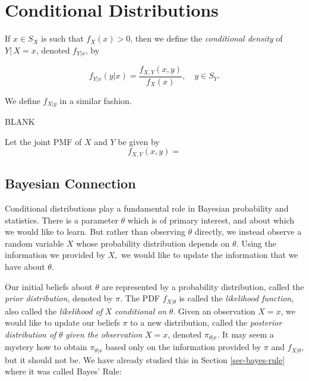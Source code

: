 \documentclass[]{book}
\numberwithin{equation}{chapter}
\numberwithin{figure}{chapter}
\theoremstyle{plain}
\theoremstyle{definition}
\theoremstyle{remark}
\theoremstyle{definition}
\theoremstyle{definition}
\theoremstyle{remark}
\let\BeginKnitrBlock\begin \let\EndKnitrBlock\end
\begin{document}
\section{Conditional Distributions}\label{sec-conditional-distributions}

If \(x\in S_{X}\) is such that \(f_{X}(x)>0\), then we define the
\emph{conditional density} of \(Y|\, X=x\), denoted \(f_{Y|x}\), by

\begin{equation}
f_{Y|x}(y|x)=\frac{f_{X,Y}(x,y)}{f_{X}(x)},\quad y\in S_{Y}.
\end{equation}

We define \(f_{X|y}\) in a similar fashion.

BLANK

\bigskip

\BeginKnitrBlock{example}
\protect\hypertarget{ex:unnamed-chunk-305}{}{\label{ex:unnamed-chunk-305}}Let
the joint PMF of \(X\) and \(Y\) be given by \[
f_{X,Y}(x,y) =
\]
\EndKnitrBlock{example}

\subsection{Bayesian Connection}\label{bayesian-connection}

Conditional distributions play a fundamental role in Bayesian
probability and statistics. There is a parameter \(\theta\) which is of
primary interest, and about which we would like to learn. But rather
than observing \(\theta\) directly, we instead observe a random variable
\(X\) whose probability distribution depends on \(\theta\). Using the
information we provided by \(X,\) we would like to update the
information that we have about \(\theta\).

Our initial beliefs about \(\theta\) are represented by a probability
distribution, called the \emph{prior distribution}, denoted by \(\pi\).
The PDF \(f_{X|\theta}\) is called the \emph{likelihood function}, also
called the \emph{likelihood of} \(X\) \emph{conditional on} \(\theta\).
Given an observation \(X=x\), we would like to update our beliefs
\(\pi\) to a new distribution, called the \emph{posterior distribution
of} \(\theta\) \emph{given the observation} \(X=x\), denoted
\(\pi_{\theta|x}\). It may seem a mystery how to obtain
\(\pi_{\theta|x}\) based only on the information provided by \(\pi\) and
\(f_{X|\theta}\), but it should not be. We have already studied this in
Section \ref{sec-bayes-rule} where it was called Bayes' Rule:
\end{document}
